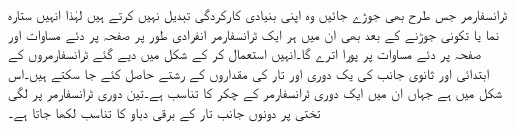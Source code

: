 ٹرانسفارمر جس طرح بھی جوڑے جائیں وہ اپنی بنیادی کارکردگی تبدیل نہیں کرتے ہیں لہٰذا انہیں ستارہ نما یا تکونی جوڑنے کے بعد بھی ان میں ہر ایک ٹرانسفارمر انفرادی طور پر صفحہ  پر دئے مساوات   اور صفحہ  پر دئے مساوات   پر پورا اترے گا۔انہیں استعمال کر کے شکل   میں دیے گئے ٹرانسفارمروں کے ابتدائی اور ثانوی جانب کی یک دوری اور تار کی مقداروں کے رشتے حاصل کئے جا سکتے ہیں۔اس شکل میں  ہے جہاں   ان میں ایک دوری ٹرانسفارمر کے چکر کا تناسب ہے۔تین دوری ٹرانسفارمر پر لگی تختی پر دونوں جانب تار کے برقی دباو کا تناسب لکھا جاتا ہے۔
\begin{figure}
\centering
\end{figure}
